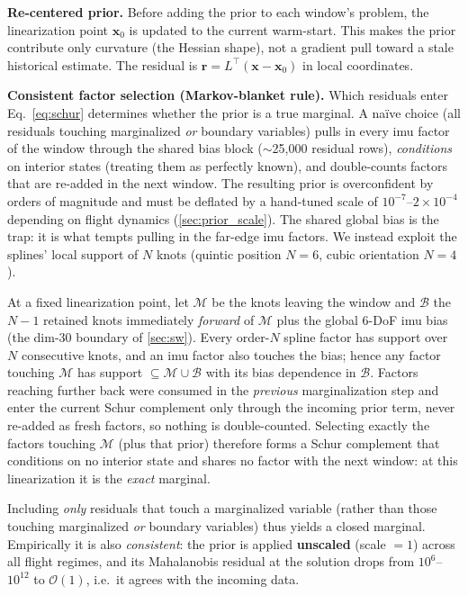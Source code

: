 \textbf{Re-centered prior.}
Before adding the prior to each window's problem, the linearization
point $\mathbf{x}_0$ is updated to the current warm-start.  This
makes the prior contribute only curvature (the Hessian shape), not a
gradient pull toward a stale historical estimate.  The residual is
$\mathbf{r} = L^{\top}(\mathbf{x} - \mathbf{x}_0)$ in local
coordinates.

\textbf{Consistent factor selection (Markov-blanket rule).}
Which residuals enter Eq.~\eqref{eq:schur} determines whether the
prior is a true marginal.  A na\"ive choice (all residuals touching
marginalized \emph{or} boundary variables) pulls in every \ac{imu} factor
of the window through the shared bias block ($\sim$25{,}000 residual
rows), \emph{conditions} on interior states (treating them as perfectly
known), and double-counts factors that are re-added in the next window.
The resulting prior is overconfident by orders of magnitude and must be
deflated by a hand-tuned scale of $10^{-7}$--$2{\times}10^{-4}$
depending on flight dynamics (\autoref{sec:prior_scale}).
The shared global bias is the trap: it is what tempts pulling in the
far-edge \ac{imu} factors.  We instead exploit the splines' local support
of $N$ knots (quintic position $N{=}6$, cubic orientation $N{=}4$).

\begin{proposition}
\label{prop:marg}
At a fixed linearization point, let $\mathcal{M}$ be the knots leaving the
window and $\mathcal{B}$ the $N{-}1$ retained knots immediately
\emph{forward} of $\mathcal{M}$ plus the global 6-DoF \ac{imu} bias (the
dim-30 boundary of \autoref{sec:sw}).  Every order-$N$ spline factor has
support over $N$ consecutive knots, and an \ac{imu} factor also touches the
bias; hence any factor touching $\mathcal{M}$ has support
$\subseteq\mathcal{M}\cup\mathcal{B}$ with its bias dependence in
$\mathcal{B}$.  Factors reaching further back were consumed in the
\emph{previous} marginalization step and enter the current Schur complement
only through the incoming prior term, never re-added as fresh factors, so
nothing is double-counted.  Selecting exactly the factors touching
$\mathcal{M}$ (plus that prior) therefore forms a Schur complement that
conditions on no interior state and shares no factor with the next window:
at this linearization it is the \emph{exact} marginal.
\end{proposition}

Including \emph{only} residuals that touch a marginalized variable
(rather than those touching marginalized \emph{or} boundary variables)
thus yields a closed marginal.  Empirically it is also \emph{consistent}:
the prior is applied \textbf{unscaled} (scale $=1$) across all flight
regimes, and its Mahalanobis residual at the solution drops from
$10^{6}$--$10^{12}$ to $\mathcal{O}(1)$, i.e.\ it agrees with the incoming data.

